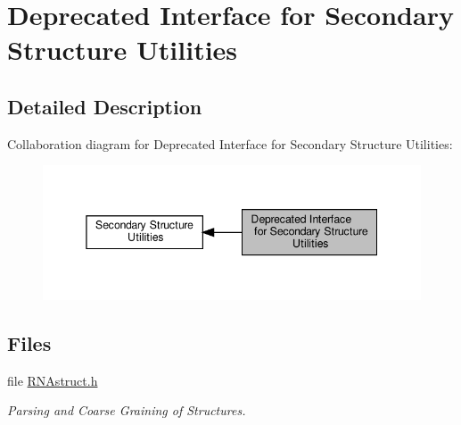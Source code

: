 \hypertarget{group__struct__utils__deprecated}{}\section{Deprecated Interface for Secondary Structure Utilities}
\label{group__struct__utils__deprecated}


\subsection{Detailed Description}
Collaboration diagram for Deprecated Interface for Secondary Structure Utilities\+:
\nopagebreak
\begin{figure}[H]
\begin{center}
\leavevmode
\includegraphics[width=345pt]{group__struct__utils__deprecated}
\end{center}
\end{figure}
\subsection*{Files}
\begin{DoxyCompactItemize}
\item 
file \hyperlink{RNAstruct_8h}{R\+N\+Astruct.\+h}
\begin{DoxyCompactList}\small\item\em Parsing and Coarse Graining of Structures. \end{DoxyCompactList}\end{DoxyCompactItemize}
